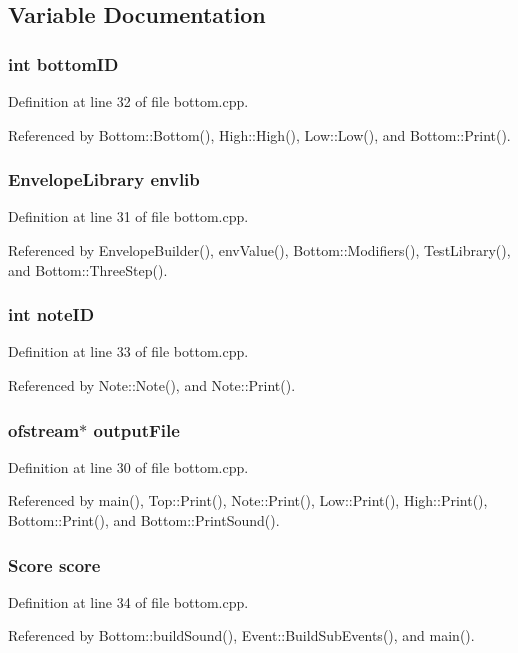 \subsection{Variable Documentation}
\subsubsection{\setlength{\rightskip}{0pt plus 5cm}int {\bf bottom\-ID}}\label{bottom_8cpp_a2}




Definition at line 32 of file bottom.cpp.

Referenced by Bottom::Bottom(), High::High(), Low::Low(), and Bottom::Print().
\subsubsection{\setlength{\rightskip}{0pt plus 5cm}Envelope\-Library {\bf envlib}}\label{bottom_8cpp_a1}




Definition at line 31 of file bottom.cpp.

Referenced by Envelope\-Builder(), env\-Value(), Bottom::Modifiers(), Test\-Library(), and Bottom::Three\-Step().
\subsubsection{\setlength{\rightskip}{0pt plus 5cm}int {\bf note\-ID}}\label{bottom_8cpp_a3}




Definition at line 33 of file bottom.cpp.

Referenced by Note::Note(), and Note::Print().
\subsubsection{\setlength{\rightskip}{0pt plus 5cm}ofstream$\ast$ {\bf output\-File}}\label{bottom_8cpp_a0}




Definition at line 30 of file bottom.cpp.

Referenced by main(), Top::Print(), Note::Print(), Low::Print(), High::Print(), Bottom::Print(), and Bottom::Print\-Sound().
\subsubsection{\setlength{\rightskip}{0pt plus 5cm}Score {\bf score}}\label{bottom_8cpp_a4}




Definition at line 34 of file bottom.cpp.

Referenced by Bottom::build\-Sound(), Event::Build\-Sub\-Events(), and main().